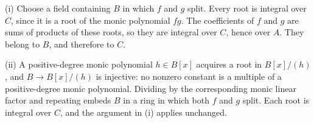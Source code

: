 (i) Choose a field containing $B$ in which $f$ and $g$ split. Every root is integral over $C$, since it is a root of the monic polynomial $fg$. The coefficients of $f$ and $g$ are sums of products of these roots, so they are integral over $C$, hence over $A$. They belong to $B$, and therefore to $C$.

(ii) A positive-degree monic polynomial $h\in B[x]$ acquires a root in $B[x]/(h)$, and $B\to B[x]/(h)$ is injective: no nonzero constant is a multiple of a positive-degree monic polynomial. Dividing by the corresponding monic linear factor and repeating embeds $B$ in a ring in which both $f$ and $g$ split. Each root is integral over $C$, and the argument in (i) applies unchanged.
